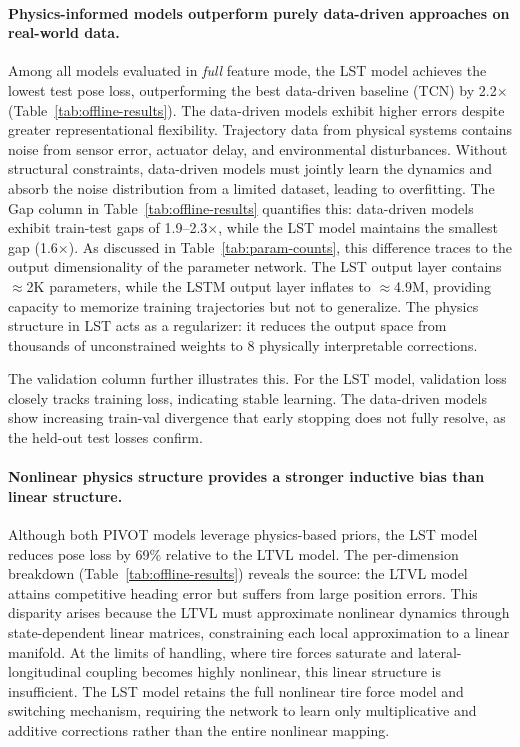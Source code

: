 \paragraph{Physics-informed models outperform purely data-driven approaches on real-world data.}
Among all models evaluated in \emph{full} feature mode, the LST model achieves the lowest test pose loss, outperforming the best data-driven baseline (TCN) by 2.2$\times$ (Table~\ref{tab:offline-results}). The data-driven models exhibit higher errors despite greater representational flexibility. Trajectory data from physical systems contains noise from sensor error, actuator delay, and environmental disturbances. Without structural constraints, data-driven models must jointly learn the dynamics and absorb the noise distribution from a limited dataset, leading to overfitting. The Gap column in Table~\ref{tab:offline-results} quantifies this: data-driven models exhibit train-test gaps of 1.9--2.3$\times$, while the LST model maintains the smallest gap (1.6$\times$). As discussed in Table~\ref{tab:param-counts}, this difference traces to the output dimensionality of the parameter network. The LST output layer contains $\approx$2K parameters, while the LSTM output layer inflates to $\approx$4.9M, providing capacity to memorize training trajectories but not to generalize. The physics structure in LST acts as a regularizer: it reduces the output space from thousands of unconstrained weights to 8 physically interpretable corrections.

The validation column further illustrates this. For the LST model, validation loss closely tracks training loss, indicating stable learning. The data-driven models show increasing train-val divergence that early stopping does not fully resolve, as the held-out test losses confirm.

\paragraph{Nonlinear physics structure provides a stronger inductive bias than linear structure.}
Although both PIVOT models leverage physics-based priors, the LST model reduces pose loss by 69\% relative to the LTVL model. The per-dimension breakdown (Table~\ref{tab:offline-results}) reveals the source: the LTVL model attains competitive heading error but suffers from large position errors. This disparity arises because the LTVL must approximate nonlinear dynamics through state-dependent linear matrices, constraining each local approximation to a linear manifold. At the limits of handling, where tire forces saturate and lateral-longitudinal coupling becomes highly nonlinear, this linear structure is insufficient. The LST model retains the full nonlinear tire force model and switching mechanism, requiring the network to learn only multiplicative and additive corrections rather than the entire nonlinear mapping.

